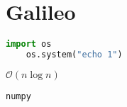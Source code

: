 \chapter{Galileo}
\label{sec:appendix_galileo}

\begin{lstlisting}[language=Python]
    import os
    os.system("echo 1")
\end{lstlisting}

$\mathcal{O}\left(n\log{n}\right)$

\verb+numpy+

